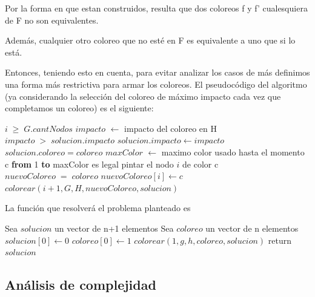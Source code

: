 Por la forma en que estan construidos, resulta que dos coloreos f y f' cualesquiera de F no son equivalentes. 

Adem\'as, cualquier otro coloreo que no est\'e en F es equivalente a uno que si lo est\'a.

Entonces, teniendo esto en cuenta, para evitar analizar los casos de m\'as definimos una forma m\'as restrictiva para armar los coloreos.
El pseudoc\'odigo del algoritmo (ya considerando la selecci\'on del coloreo de m\'aximo impacto cada vez que completamos un coloreo) es el siguiente:

\begin{algorithm}[H]
\caption{} 
\begin{codebox}

\li \If $i \; \geq \; G.cantNodos$  \Do
\li	$impacto$ $\gets$ impacto del coloreo en H
\li		\If $impacto\; > \; solucion.impacto$ \Do
\li			$solucion.impacto \gets impacto$
\li			$solucion.coloreo = coloreo$
			\End
	\End
\li \Else \Do
\li		$maxColor$ $\gets$ maximo color usado hasta el momento 	
\li		\For c \textbf{from} 1 \textbf{to} maxColor \Do
\li			\If es legal pintar el nodo $i$ de color c \Do
\li					$nuevoColoreo \; = \; coloreo$
\li         $nuevoColoreo[i] \gets c$
\li         $colorear(i+1, G, H, nuevoColoreo, solucion)$
             \End
         \End
\End
\end{codebox}
\end{algorithm}


La funci\'on que resolver\'a el problema planteado es

\begin{algorithm}[H]
\caption{} 
\begin{codebox}
\li Sea $solucion$ un vector de n+1 elementos
\li Sea $coloreo$ un vector de n elementos
\li $solucion[0] \gets 0$
\li $coloreo[0] \gets 1$
\li $colorear(1,g,h,coloreo,solucion)$
\li	return $solucion$
\End
\end{codebox}
\end{algorithm}



\subsection{Análisis de complejidad}


